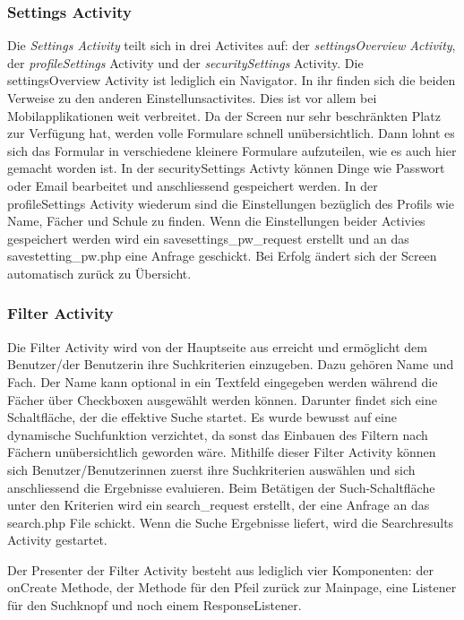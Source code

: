 \documentclass[a4paper,11pt]{report}
\begin{document}
				\subsubsection{Settings Activity} \label{settings:act}
				Die \emph{Settings Activity} teilt sich in drei Activites auf: der \emph{settingsOverview Activity}, der \emph{profileSettings} Activity und der \emph{securitySettings} Activity. Die settingsOverview Activity ist lediglich ein Navigator. In ihr finden sich die beiden Verweise zu den anderen Einstellunsactivites. Dies ist vor allem bei Mobilapplikationen weit verbreitet. Da der Screen nur sehr beschränkten Platz zur Verfügung hat, werden volle Formulare schnell unübersichtlich. Dann lohnt es sich das Formular in verschiedene kleinere Formulare aufzuteilen, wie es auch hier gemacht worden ist. In der securitySettings Activty können Dinge wie Passwort oder Email bearbeitet und anschliessend gespeichert werden. In der profileSettings Activity wiederum sind die Einstellungen bezüglich des Profils wie Name, Fächer und Schule zu finden. Wenn die Einstellungen beider Activies gespeichert werden wird ein savesettings\_pw\_request erstellt und an das savestetting\_pw.php eine Anfrage geschickt. Bei Erfolg ändert sich der Screen automatisch zurück zu Übersicht.
				
				\subsubsection{Filter Activity} \label{filter:act}
				Die Filter Activity wird von der Hauptseite aus erreicht und ermöglicht dem Benutzer/der Benutzerin ihre Suchkriterien einzugeben. Dazu gehören Name und Fach. Der Name kann optional in ein Textfeld eingegeben werden während die Fächer über Checkboxen ausgewählt werden können. Darunter findet sich eine Schaltfläche, der die effektive Suche startet. Es wurde bewusst auf eine dynamische Suchfunktion verzichtet, da sonst das Einbauen des Filtern nach Fächern unübersichtlich geworden wäre. Mithilfe dieser Filter Activity können sich Benutzer/Benutzerinnen zuerst ihre Suchkriterien auswählen und sich anschliessend die Ergebnisse evaluieren. Beim Betätigen der Such-Schaltfläche unter den Kriterien wird ein search\_request erstellt, der eine Anfrage an das search.php File schickt. Wenn die Suche Ergebnisse liefert, wird die Searchresults Activity gestartet.
				
				Der Presenter der Filter Activity besteht aus lediglich vier Komponenten: der onCreate Methode, der Methode für den Pfeil zurück zur Mainpage, eine Listener für den Suchknopf und noch einem ResponseListener.
				
\end{document}
